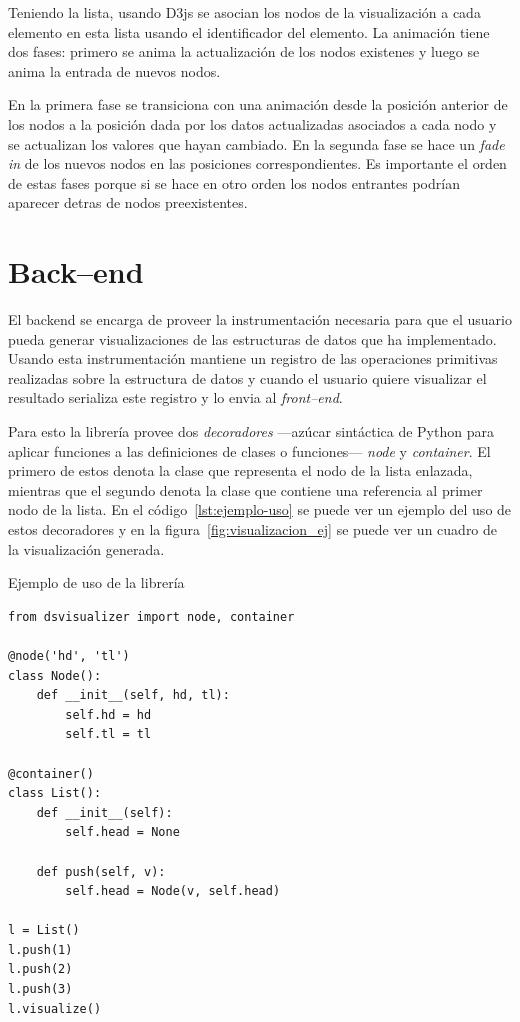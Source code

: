 Teniendo la lista, usando D3js se asocian los nodos de la visualización a cada elemento en esta lista usando el identificador del elemento. La animación tiene dos fases: primero se anima la actualización de los nodos existenes y luego se anima la entrada de nuevos nodos.

En la primera fase se transiciona con una animación desde la posición anterior de los nodos a la posición dada por los datos actualizadas asociados a cada nodo y se actualizan los valores que hayan cambiado. En la segunda fase se hace un \textit{fade in} de los nuevos nodos en las posiciones correspondientes. Es importante el orden de estas fases porque si se hace en otro orden los nodos entrantes podrían aparecer detras de nodos preexistentes.

\section{Back--end}

El backend se encarga de proveer la instrumentación necesaria para que el usuario pueda generar visualizaciones de las estructuras de datos que ha implementado. Usando esta instrumentación mantiene un registro de las operaciones primitivas realizadas sobre la estructura de datos y cuando el usuario quiere visualizar el resultado serializa este registro y lo envia al \textit{front--end}.

Para esto la librería provee dos \textit{decoradores} ---azúcar sintáctica de Python para aplicar funciones a las definiciones de clases o funciones--- \textit{node} y \textit{container}. El primero de estos denota la clase que representa el nodo de la lista enlazada, mientras que el segundo denota la clase que contiene una referencia al primer nodo de la lista. En el código~\ref{lst:ejemplo-uso} se puede ver un ejemplo del uso de estos decoradores y en la figura~\ref{fig:visualizacion_ej} se puede ver un cuadro de la visualización generada.

\begin{listing}[htb]
\caption{Ejemplo de uso de la librería}
\label{lst:ejemplo-uso}
\begin{verbatim}
from dsvisualizer import node, container

@node('hd', 'tl')
class Node():
    def __init__(self, hd, tl):
        self.hd = hd
        self.tl = tl

@container()
class List():
    def __init__(self):
        self.head = None

    def push(self, v):
        self.head = Node(v, self.head)

l = List()
l.push(1)
l.push(2)
l.push(3)
l.visualize()
\end{verbatim}
\end{listing}

